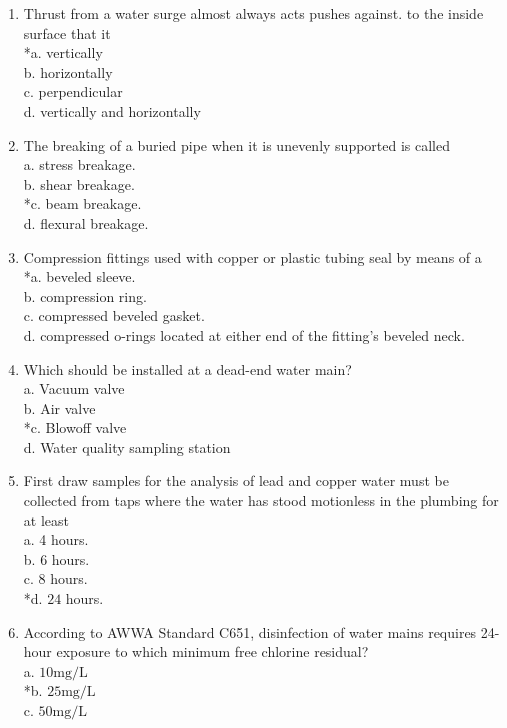 \begin{enumerate}[1.]
\item Thrust from a water surge almost always acts pushes against. to the inside surface that it\\
*a. vertically\\
b. horizontally\\
c. perpendicular\\
d. vertically and horizontally\\
\item The breaking of a buried pipe when it is unevenly supported is called\\
a. stress breakage.\\
b. shear breakage.\\
*c. beam breakage.\\
d. flexural breakage.\\
\item Compression fittings used with copper or plastic tubing seal by means of a\\
*a. beveled sleeve.\\
b. compression ring.\\
c. compressed beveled gasket.\\
d. compressed o-rings located at either end of the fitting's beveled neck.\\
\item Which should be installed at a dead-end water main?\\
a. Vacuum valve\\
b. Air valve\\
*c. Blowoff valve\\
d. Water quality sampling station\\
\item First draw samples for the analysis of lead and copper water must be collected from taps where the water has stood motionless in the plumbing for at least\\
a. 4 hours.\\
b. 6 hours.\\
c. 8 hours.\\
*d. $24$ hours.\\
\item According to AWWA Standard C651, disinfection of water mains requires 24-hour exposure to which minimum free chlorine residual?\\
a. $10 \mathrm{mg} / \mathrm{L}$\\
*b. $25 \mathrm{mg} / \mathrm{L}$\\
c. $50 \mathrm{mg} / \mathrm{L}$\\

\end{enumerate}
